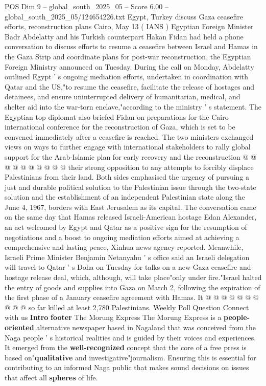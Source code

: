 \begin{textsample}{POS Dim 9 – global\_south\_2025\_05 – Score 6.00 – global\_south\_2025\_05/124654226.txt}  \label{ex:f9_pos_204}
Egypt, Turkey discuss Gaza ceasefire efforts, reconstruction plans Cairo, May 13 ( IANS ) Egyptian Foreign Minister Badr Abdelatty and his Turkish counterpart Hakan Fidan had held a phone conversation to discuss efforts to resume a ceasefire between Israel and Hamas in the Gaza Strip and coordinate plans for post-war reconstruction, the Egyptian Foreign Ministry announced on Tuesday.
During the call on Monday, Abdelatty outlined Egypt ' s ongoing mediation efforts, undertaken in coordination with Qatar and the US,"to resume the ceasefire, facilitate the release of hostages and detainees, and ensure uninterrupted delivery of humanitarian, medical, and shelter aid into the war-torn enclave,"according to the ministry ' s statement.
The Egyptian top diplomat also briefed Fidan on preparations for the Cairo international conference for the reconstruction of Gaza, which is set to be convened immediately after a ceasefire is reached.
The two ministers exchanged views on ways to further engage with international stakeholders to rally global support for the Arab-Islamic plan for early recovery and the reconstruction @ @ @ @ @ @ @ @ @ @ their strong opposition to any attempts to forcibly displace Palestinians from their land.
Both sides emphasised the urgency of pursuing a just and durable political solution to the Palestinian issue through the two-state solution and the establishment of an independent Palestinian state along the June 4, 1967, borders with East Jerusalem as its capital.
The conversation came on the same day that Hamas released Israeli-American hostage Edan Alexander, an act welcomed by Egypt and Qatar as a positive sign for the resumption of negotiations and a boost to ongoing mediation efforts aimed at achieving a comprehensive and lasting peace, Xinhua news agency reported.
Meanwhile, Israeli Prime Minister Benjamin Netanyahu ' s office said an Israeli delegation will travel to Qatar ' s Doha on Tuesday for talks on a new Gaza ceasefire and hostage release deal, which, although, will take place"only under fire."Israel halted the entry of goods and supplies into Gaza on March 2, following the expiration of the first phase of a January ceasefire agreement with Hamas.
It @ @ @ @ @ @ @ @ @ @ so far killed at least 2,780 Palestinians.
Weekly Poll Question Connect with us \textbf{Intro} \textbf{footer} The Morung Express The Morung Express is a \textbf{people-oriented} alternative newspaper based in Nagaland that was conceived from the Naga people ' s historical realities and is guided by their voices and experiences.
It emerged from the \textbf{well-recognized} concept that the core of a free press is based on"\textbf{qualitative} and investigative"journalism.
Ensuring this is essential for contributing to an informed Naga public that makes sound decisions on issues that affect all \textbf{spheres} of life.

\end{textsample}
